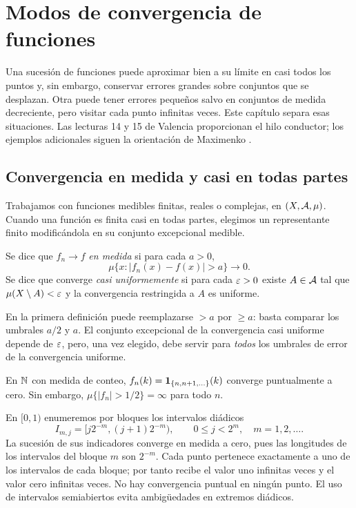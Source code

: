 \chapter{Modos de convergencia de funciones}\label{cap:v2-07}

Una sucesión de funciones puede aproximar bien a su límite en casi todos los puntos y, sin embargo, conservar errores grandes sobre conjuntos que se desplazan. Otra puede tener errores pequeños salvo en conjuntos de medida decreciente, pero visitar cada punto infinitas veces. Este capítulo separa esas situaciones. Las lecturas 14 y 15 de Valencia \cite{valencia2} proporcionan el hilo conductor; los ejemplos adicionales siguen la orientación de Maximenko \cite{maximenkoConvergencias}.

\section{Convergencia en medida y casi en todas partes}\label{lectura:v2-14}
Trabajamos con funciones medibles finitas, reales o complejas, en $(X,\mathcal A,\mu)$. Cuando una función es finita casi en todas partes, elegimos un representante finito modificándola en su conjunto excepcional medible.
\begin{definicion}
Se dice que $f_n\to f$ \emph{en medida} si para cada $a>0$,
\[\mu\{x:|f_n(x)-f(x)|>a\}\longrightarrow0.\]
Se dice que converge \emph{casi uniformemente} si para cada $\varepsilon>0$ existe $A\in\mathcal A$ tal que $\mu(X\setminus A)<\varepsilon$ y la convergencia restringida a $A$ es uniforme.
\end{definicion}
En la primera definición puede reemplazarse $>a$ por $\ge a$: basta comparar los umbrales $a/2$ y $a$. El conjunto excepcional de la convergencia casi uniforme depende de $\varepsilon$, pero, una vez elegido, debe servir para \emph{todos} los umbrales de error de la convergencia uniforme.

\begin{ejemplo}
En $\mathbb N$ con medida de conteo, $f_n(k)=\mathbf1_{\{n,n+1,\ldots\}}(k)$ converge puntualmente a cero. Sin embargo, $\mu\{|f_n|>1/2\}=\infty$ para todo $n$.

En $[0,1)$ enumeremos por bloques los intervalos diádicos
\[I_{m,j}=[j2^{-m},(j+1)2^{-m}),\qquad 0\le j<2^m,\quad m=1,2,\ldots .\]
La sucesión de sus indicadores converge en medida a cero, pues las longitudes de los intervalos del bloque $m$ son $2^{-m}$. Cada punto pertenece exactamente a uno de los intervalos de cada bloque; por tanto recibe el valor uno infinitas veces y el valor cero infinitas veces. No hay convergencia puntual en ningún punto. El uso de intervalos semiabiertos evita ambigüedades en extremos diádicos.
\end{ejemplo}

